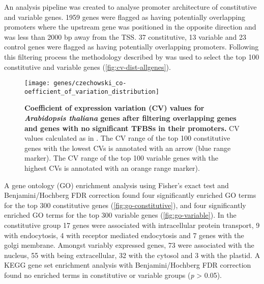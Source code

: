 \documentclass[../main.tex]{subfiles}
\begin{document}
An analysis pipeline was created to analyse promoter architecture of constitutive and variable genes.
1959 genes were flagged as having potentially overlapping promoters where the upstream gene was positioned in the opposite direction and was less than 2000 bp away from the TSS.
37 constitutive, 13 variable and 23 control genes were flagged as having potentially overlapping promoters.
Following this filtering process the methodology described by \textcite{czechowskiGenomeWideIdentificationTesting2005} was used to select the top 100 constitutive and variable genes (\autoref{fig:cv-dist-allgenes}).

\begin{figure}[hbt!]
	\begin{center}
		\capstart
		\texttt{[image: genes/czechowski\_co-oefficient\_of\_variation\_distribution]}
		\caption{
			\textbf{Coefficient of expression variation (CV) values for \textit{Arabidopsis thaliana} genes after filtering overlapping genes and genes with no significant TFBSs in their promoters.}
			CV values calculated as in \textcite{czechowskiGenomeWideIdentificationTesting2005}.
			The CV range of the top 100 constitutive genes with the lowest CVs is annotated with an arrow (blue range marker).
			The CV range of the top 100 variable genes with the highest CVs is annotated with an orange range marker).			
			\label{fig:cv-dist-allgenes}
		}
	\end{center}
\end{figure}


A gene ontology (GO) enrichment analysis using Fisher's exact test \autocite{fisherInterpretationContingencyTables1922} and Benjamini/Hochberg FDR correction \autocite{benjaminiControllingFalseDiscovery1995} found four significantly enriched GO terms for the top 300 constitutive genes (\autoref{fig:go-constitutive}), and four significantly enriched GO terms for the top 300 variable genes (\autoref{fig:go-variable}).
In the constitutive group 17 genes were associated with intracellular protein transport, 9 with endocytosis, 4 with receptor mediated endocytosis and 7 genes with the golgi membrane.
Amongst variably expressed genes, 73 were associated with the nucleus, 55 with being extracellular, 32 with the cytosol and 3 with the plastid.
A KEGG gene set enrichment analysis with Benjamini/Hochberg FDR correction found no enriched terms in constitutive or variable groups (\textit{p} \textgreater{} 0.05).
\end{document}
